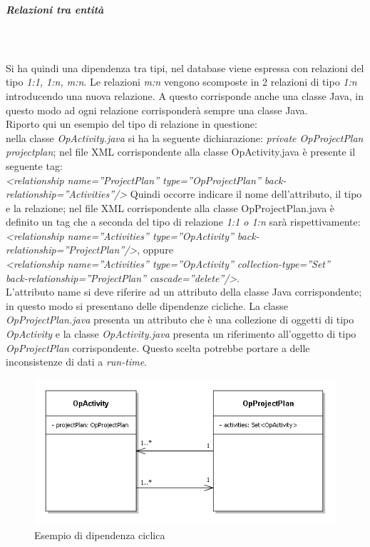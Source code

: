 \subparagraph{Relazioni tra entit\`{a}} \quad \quad \\ \\
Si ha quindi una dipendenza tra tipi, nel database viene espressa con relazioni del tipo \textit{1:1, 1:n, m:n}. Le relazioni \textit{m:n} vengono scomposte in 2 relazioni di tipo \textit{1:n} introducendo una nuova relazione. A questo corrisponde anche una classe Java, in questo modo ad ogni relazione corrisponder\`{a} sempre una classe Java.\\
Riporto qui un esempio del tipo di relazione in questione: \\
nella classe \textit{OpActivity.java} si ha la seguente dichiarazione: \textit{private OpProjectPlan projectplan}; nel file XML corrispondente alla classe OpActivity.java \`{e} presente il seguente tag: \\
\textit{<relationship name=''ProjectPlan'' type=''OpProjectPlan'' back-relationship=''Activities''/>}
Quindi occorre indicare il nome dell\textquoteright{}attributo, il tipo e la relazione; nel file XML corrispondente alla classe OpProjectPlan.java \`{e} definito un tag che a seconda del tipo di relazione \textit{1:1 o 1:n} sar\`{a} rispettivamente: \\
\textit{<relationship name=''Activities'' type=''OpActivity'' back-relationship=''ProjectPlan''/>}, oppure \\
\textit{<relationship name=''Activities'' type=''OpActivity'' collection-type=''Set'' \\ back-relationship=''ProjectPlan'' cascade=''delete''/>}.\\
L\textquoteright{}attributo name si deve riferire ad un attributo della classe Java corrispondente; in questo modo si presentano delle dipendenze cicliche. La classe \textit{OpProjectPlan.java} presenta un attributo che \`{e} una collezione di oggetti di tipo \textit{OpActivity} e la classe \textit{OpActivity.java} presenta un riferimento all\textquoteright{}oggetto di tipo \textit{OpProjectPlan} corrispondente. Questo scelta potrebbe portare a delle inconsistenze di dati a \textit{run-time}.

\begin{figure}[H]
\begin{center}
\includegraphics[width=1\textwidth]{img/DipendenzaCiclica.png}
\caption{Esempio di dipendenza ciclica}
\label{fig:Esempio di dipendenza ciclica}
\end{center}
\end{figure}
